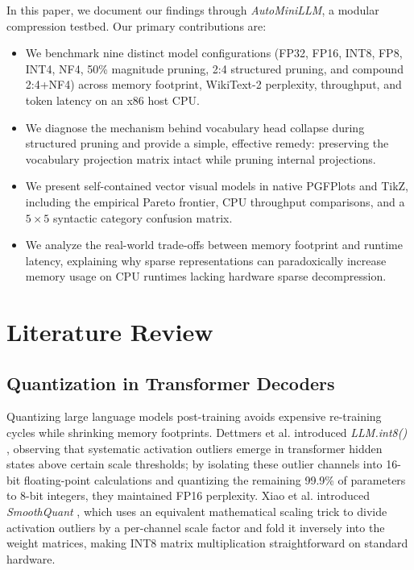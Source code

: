 \documentclass[conference]{IEEEtran}
\begin{document}
In this paper, we document our findings through \textit{AutoMiniLLM}, a modular compression testbed. Our primary contributions are:
\begin{itemize}
    \item We benchmark nine distinct model configurations (FP32, FP16, INT8, FP8, INT4, NF4, 50\% magnitude pruning, 2:4 structured pruning, and compound 2:4+NF4) across memory footprint, WikiText-2 perplexity, throughput, and token latency on an x86 host CPU.
    \item We diagnose the mechanism behind vocabulary head collapse during structured pruning and provide a simple, effective remedy: preserving the vocabulary projection matrix intact while pruning internal projections.
    \item We present self-contained vector visual models in native PGFPlots and TikZ, including the empirical Pareto frontier, CPU throughput comparisons, and a $5 \times 5$ syntactic category confusion matrix.
    \item We analyze the real-world trade-offs between memory footprint and runtime latency, explaining why sparse representations can paradoxically increase memory usage on CPU runtimes lacking hardware sparse decompression.
\end{itemize}

\section{Literature Review}

\subsection{Quantization in Transformer Decoders}
Quantizing large language models post-training avoids expensive re-training cycles while shrinking memory footprints. Dettmers et al. introduced \textit{LLM.int8()} \cite{dettmers2022llm}, observing that systematic activation outliers emerge in transformer hidden states above certain scale thresholds; by isolating these outlier channels into 16-bit floating-point calculations and quantizing the remaining 99.9\% of parameters to 8-bit integers, they maintained FP16 perplexity. Xiao et al. introduced \textit{SmoothQuant} \cite{xiao2023smoothquant}, which uses an equivalent mathematical scaling trick to divide activation outliers by a per-channel scale factor and fold it inversely into the weight matrices, making INT8 matrix multiplication straightforward on standard hardware.
\end{document}
